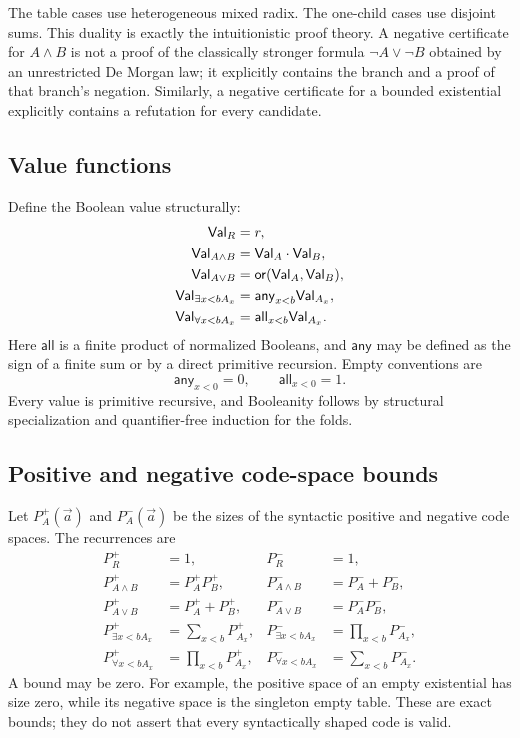 The table cases use heterogeneous mixed radix.  The one-child cases use
disjoint sums.  This duality is exactly the intuitionistic proof theory.  A
negative certificate for \(A\wedge B\) is not a proof of the classically
stronger formula \(\neg A\vee\neg B\) obtained by an unrestricted De Morgan
law; it explicitly contains the branch and a proof of that branch's negation.
Similarly, a negative certificate for a bounded existential explicitly
contains a refutation for every candidate.

\subsection{Value functions}

Define the Boolean value structurally:
\begin{align*}
 \mathsf{Val}_R &= r,\\
 \mathsf{Val}_{A\wedge B} &= \mathsf{Val}_A\cdot\mathsf{Val}_B,\\
 \mathsf{Val}_{A\vee B} &= \mathsf{or}(\mathsf{Val}_A,\mathsf{Val}_B),\\
 \mathsf{Val}_{\exists x<b A_x} &= \mathsf{any}_{x<b}\mathsf{Val}_{A_x},\\
 \mathsf{Val}_{\forall x<b A_x} &= \mathsf{all}_{x<b}\mathsf{Val}_{A_x}.
\end{align*}
Here \(\mathsf{all}\) is a finite product of normalized Booleans, and
\(\mathsf{any}\) may be defined as the sign of a finite sum or by a direct
primitive recursion.  Empty conventions are
\[
 \mathsf{any}_{x<0}=0,
 \qquad
 \mathsf{all}_{x<0}=1.
\]
Every value is primitive recursive, and Booleanity follows by structural
specialization and quantifier-free induction for the folds.

\subsection{Positive and negative code-space bounds}

Let \(P_A^+(\vec a)\) and \(P_A^-(\vec a)\) be the sizes of the syntactic
positive and negative code spaces.  The recurrences are
\begin{align*}
 P_R^+&=1,&P_R^-&=1,\\
 P_{A\wedge B}^+&=P_A^+P_B^+,&
 P_{A\wedge B}^-&=P_A^-+P_B^-,\\
 P_{A\vee B}^+&=P_A^++P_B^+,&
 P_{A\vee B}^-&=P_A^-P_B^-,\\
 P_{\exists x<b A_x}^+&=\sum_{x<b}P_{A_x}^+,&
 P_{\exists x<b A_x}^-&=\prod_{x<b}P_{A_x}^-,\\
 P_{\forall x<b A_x}^+&=\prod_{x<b}P_{A_x}^+,&
 P_{\forall x<b A_x}^-&=\sum_{x<b}P_{A_x}^-.
\end{align*}
A bound may be zero.  For example, the positive space of an empty existential
has size zero, while its negative space is the singleton empty table.  These
are exact bounds; they do not assert that every syntactically shaped code is
valid.

